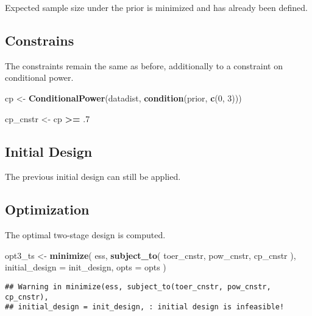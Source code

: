 \documentclass[]{book}
\newenvironment{Shaded}{\begin{snugshade}}{\end{snugshade}}
\newcommand{\DataTypeTok}[1]{\textcolor[rgb]{0.13,0.29,0.53}{#1}}
\newcommand{\DecValTok}[1]{\textcolor[rgb]{0.00,0.00,0.81}{#1}}
\newcommand{\FloatTok}[1]{\textcolor[rgb]{0.00,0.00,0.81}{#1}}
\newcommand{\KeywordTok}[1]{\textcolor[rgb]{0.13,0.29,0.53}{\textbf{#1}}}
\newcommand{\NormalTok}[1]{#1}
\newcommand{\OperatorTok}[1]{\textcolor[rgb]{0.81,0.36,0.00}{\textbf{#1}}}
\newcommand{\StringTok}[1]{\textcolor[rgb]{0.31,0.60,0.02}{#1}}
\begin{document}
Expected sample size under the prior is minimized and has already been defined.

\hypertarget{constrains-5}{%
\subsection{Constrains}\label{constrains-5}}

The constraints remain the same as before, additionally to a constraint
on conditional power.

\begin{Shaded}
\begin{Highlighting}[]
\NormalTok{cp <-}\StringTok{ }\KeywordTok{ConditionalPower}\NormalTok{(datadist, }\KeywordTok{condition}\NormalTok{(prior, }\KeywordTok{c}\NormalTok{(}\DecValTok{0}\NormalTok{, }\DecValTok{3}\NormalTok{)))}

\NormalTok{cp_cnstr <-}\StringTok{ }\NormalTok{cp }\OperatorTok{>=}\StringTok{ }\FloatTok{.7}
\end{Highlighting}
\end{Shaded}

\hypertarget{initial-design-5}{%
\subsection{Initial Design}\label{initial-design-5}}

The previous initial design can still be applied.

\hypertarget{optimization-5}{%
\subsection{Optimization}\label{optimization-5}}

The optimal two-stage design is computed.

\begin{Shaded}
\begin{Highlighting}[]
\NormalTok{opt3_ts <-}\StringTok{ }\KeywordTok{minimize}\NormalTok{(}
\NormalTok{        ess,}
        \KeywordTok{subject_to}\NormalTok{(}
\NormalTok{            toer_cnstr,}
\NormalTok{            pow_cnstr,}
\NormalTok{            cp_cnstr}
\NormalTok{        ),}
        \DataTypeTok{initial_design =}\NormalTok{ init_design,}
        \DataTypeTok{opts =}\NormalTok{ opts}
\NormalTok{)}
\end{Highlighting}
\end{Shaded}

\begin{verbatim}
## Warning in minimize(ess, subject_to(toer_cnstr, pow_cnstr, cp_cnstr),
## initial_design = init_design, : initial design is infeasible!
\end{verbatim}
\end{document}
